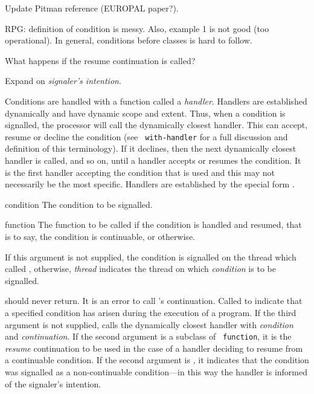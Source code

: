 \label{cond-hand}
%
\begin{optPrivate}
    Update Pitman reference (EUROPAL paper?).

    RPG: definition of condition is messy.  Also, example 1 is not good (too
    operational).  In general, conditions before classes is hard to follow.

    What happens if the resume continuation \nil\/ is called?

    Expand on {\em signaler's intention}.
\end{optPrivate}
%
\begin{optDefinition}
%
Conditions are handled with a function called a {\em
handler}.  Handlers are established
dynamically and have dynamic scope and extent.  Thus, when a condition
is signalled, the processor will call the dynamically closest handler.
This can accept, resume or decline the condition (see {\tt
with-handler} for a full discussion and definition of this
terminology).  If it declines, then the next dynamically closest
handler is called, and so on, until a handler accepts or resumes the
condition.  It is the first handler accepting the condition
that is used and this may not necessarily be the most specific.
Handlers are established by the special form .

%
\begin{arguments}
%
    \item[condition] The condition to be signalled.
%
    \item[function] The function to be called if the condition is handled and
    resumed, that is to say, the condition is continuable, or \nil
    otherwise.
%
    \item[\optional{thread}] If this argument is not supplied, the condition is
    signalled on the thread which called , otherwise, {\em
        thread} indicates the thread on which {\em condition} is to be
    signalled.
%
\end{arguments}
%
\result%
 should never return.  It is an error to call
's continuation.
%
\remarks%
Called to indicate that a specified condition has arisen during the
execution of a program.
%
If the third argument is not supplied,  calls the
dynamically closest handler with {\em condition} and {\em
continuation}.  If the second argument is a subclass of {\tt
function}, it is the {\em resume} continuation to be used in the case
of a handler deciding to resume from a continuable condition.  If the
second argument is \nil, it indicates that the condition was
signalled as a non-continuable condition---in this way the handler is
informed of the signaler's intention.


\end{optDefinition}
